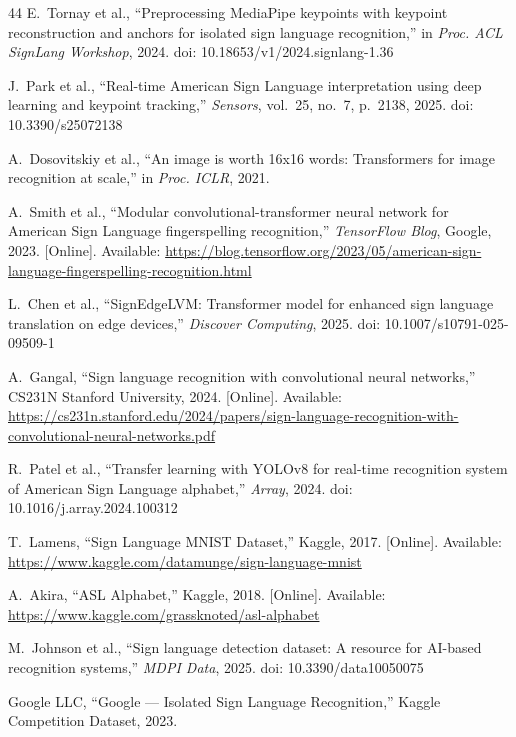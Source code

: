 \documentclass[conference]{IEEEtran}
\begin{document}
\begin{thebibliography}{44}
E.~Tornay et al., ``Preprocessing MediaPipe keypoints with keypoint
reconstruction and anchors for isolated sign language recognition,'' in
\textit{Proc. ACL SignLang Workshop}, 2024. doi: 10.18653/v1/2024.signlang-1.36

J.~Park et al., ``Real-time American Sign Language interpretation using deep
learning and keypoint tracking,'' \textit{Sensors}, vol.~25, no.~7, p.~2138,
2025. doi: 10.3390/s25072138

A.~Dosovitskiy et al., ``An image is worth 16x16 words: Transformers for image
recognition at scale,'' in \textit{Proc. ICLR}, 2021.

A.~Smith et al., ``Modular convolutional-transformer neural network for American
Sign Language fingerspelling recognition,'' \textit{TensorFlow Blog}, Google,
2023. [Online]. Available:
\url{https://blog.tensorflow.org/2023/05/american-sign-language-fingerspelling-recognition.html}

L.~Chen et al., ``SignEdgeLVM: Transformer model for enhanced sign language
translation on edge devices,'' \textit{Discover Computing}, 2025.
doi: 10.1007/s10791-025-09509-1

A.~Gangal, ``Sign language recognition with convolutional neural networks,''
CS231N Stanford University, 2024. [Online]. Available:
\url{https://cs231n.stanford.edu/2024/papers/sign-language-recognition-with-convolutional-neural-networks.pdf}

R.~Patel et al., ``Transfer learning with YOLOv8 for real-time recognition
system of American Sign Language alphabet,'' \textit{Array}, 2024.
doi: 10.1016/j.array.2024.100312

T.~Lamens, ``Sign Language MNIST Dataset,'' Kaggle, 2017. [Online]. Available:
\url{https://www.kaggle.com/datamunge/sign-language-mnist}

A.~Akira, ``ASL Alphabet,'' Kaggle, 2018. [Online]. Available:
\url{https://www.kaggle.com/grassknoted/asl-alphabet}

M.~Johnson et al., ``Sign language detection dataset: A resource for AI-based
recognition systems,'' \textit{MDPI Data}, 2025. doi: 10.3390/data10050075

Google LLC, ``Google --- Isolated Sign Language Recognition,'' Kaggle
Competition Dataset, 2023.


\end{thebibliography}
\end{document}
